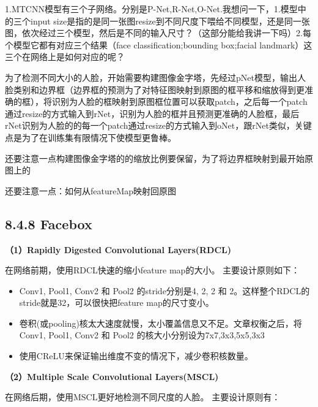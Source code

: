 \begin{figure}
\centering
\caption{}
\end{figure}

1.MTCNN模型有三个子网络。分别是P-Net,R-Net,O-Net.我想问一下，1.模型中的三个input
size是指的是同一张图resize到不同尺度下喂给不同模型，还是同一张图，依次经过三个模型，然后是不同的输入尺寸？（这部分能给我讲一下吗）2.每个模型它都有对应三个结果（face
classification;bounding box;facial
landmark）这三个在网络上是如何对应的呢？

为了检测不同大小的人脸，开始需要构建图像金字塔，先经过pNet模型，输出人脸类别和边界框（边界框的预测为了对特征图映射到原图的框平移和缩放得到更准确的框），将识别为人脸的框映射到原图框位置可以获取patch，之后每一个patch通过resize的方式输入到rNet，识别为人脸的框并且预测更准确的人脸框，最后rNet识别为人脸的的每一个patch通过resize的方式输入到oNet，跟rNet类似，关键点是为了在训练集有限情况下使模型更鲁棒。

还要注意一点构建图像金字塔的的缩放比例要保留，为了将边界框映射到最开始原图上的

还要注意一点：如何从featureMap映射回原图

\subsection{8.4.8 Facebox}\label{facebox}

\begin{figure}
\centering
\caption{}
\end{figure}

\textbf{（1）Rapidly Digested Convolutional Layers(RDCL)}

在网络前期，使用RDCL快速的缩小feature map的大小。 主要设计原则如下：

\begin{itemize}
\item
  Conv1, Pool1, Conv2 和 Pool2 的stride分别是4, 2, 2 和
  2。这样整个RDCL的stride就是32，可以很快把feature map的尺寸变小。
\item
  卷积(或pooling)核太大速度就慢，太小覆盖信息又不足。文章权衡之后，将Conv1,
  Pool1, Conv2 和 Pool2 的核大小分别设为7x7,3x3,5x5,3x3
\item
  使用CReLU来保证输出维度不变的情况下，减少卷积核数量。
\end{itemize}

\textbf{（2）Multiple Scale Convolutional Layers(MSCL)}

在网络后期，使用MSCL更好地检测不同尺度的人脸。 主要设计原则有：

